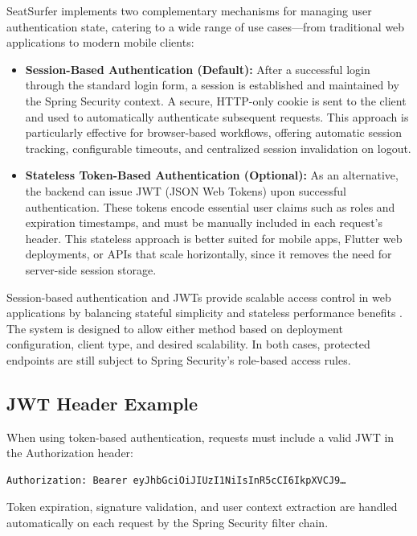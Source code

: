 \documentclass[12pt,a4paper]{report} %
\begin{document}
SeatSurfer implements two complementary mechanisms for managing user authentication state, catering to a wide range of use cases—from traditional web applications to modern mobile clients:

\begin{itemize}
    \item \textbf{Session-Based Authentication (Default):}
    After a successful login through the standard login form, a session is established and maintained by the Spring Security context. A secure, HTTP-only cookie is sent to the client and used to automatically authenticate subsequent requests. This approach is particularly effective for browser-based workflows, offering automatic session tracking, configurable timeouts, and centralized session invalidation on logout.
    
    \item \textbf{Stateless Token-Based Authentication (Optional):}  
    As an alternative, the backend can issue JWT (JSON Web Tokens) upon successful authentication. These tokens encode essential user claims such as roles and expiration timestamps, and must be manually included in each request's header. This stateless approach is better suited for mobile apps, Flutter web deployments, or APIs that scale horizontally, since it removes the need for server-side session storage.
\end{itemize}

Session-based authentication and JWTs provide scalable access control in web applications by balancing stateful simplicity and stateless performance benefits \cite{jain2023jwt}. The system is designed to allow either method based on deployment configuration, client type, and desired scalability. In both cases, protected endpoints are still subject to Spring Security's role-based access rules.

\subsection*{JWT Header Example}

When using token-based authentication, requests must include a valid JWT in the Authorization header:

\begin{verbatim}
Authorization: Bearer eyJhbGciOiJIUzI1NiIsInR5cCI6IkpXVCJ9…
\end{verbatim}

Token expiration, signature validation, and user context extraction are handled automatically on each request by the Spring Security filter chain.
\end{document}
